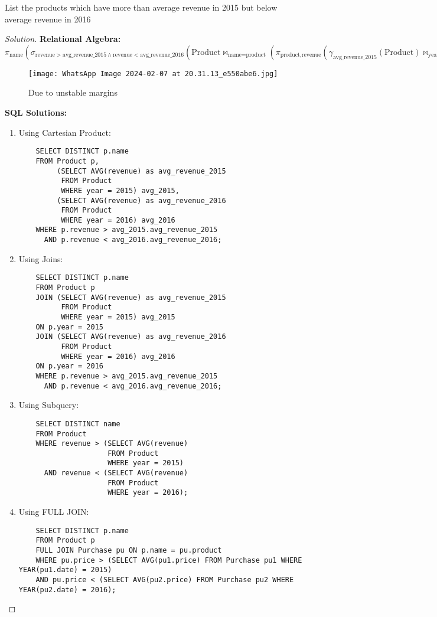 \documentclass[10pt]{article}
\newenvironment{problem}[2][Problem]{\begin{trivlist}
\item[\hskip \labelsep {\bfseries #1}\hskip \labelsep {\bfseries #2.}]}{\end{trivlist}}
\begin{document}
\begin{problem}{10}
List the products which have more than average revenue in 2015 but below average revenue in 2016
\end{problem}

\begin{proof}[Solution]
\textbf{Relational Algebra:}
\[
\pi_{\text{name}}\left(\sigma_{\text{revenue} > \text{avg\_revenue\_2015} \land \text{revenue} < \text{avg\_revenue\_2016}}
 (\text{Product} \bowtie_{\text{name} = \text{product}} (\pi_{\text{product},

\text{revenue}}(\gamma_{\text{avg\_revenue\_2015}}(\text{Product}) \bowtie_{\text{year} = 2016} \gamma_{\text{avg\_revenue\_2016}}(\text{Product}))))
\right)
\]
\begin{figure}
    \centering
    \texttt{[image: WhatsApp Image 2024-02-07 at 20.31.13\_e550abe6.jpg]}
    \caption{Due to unstable margins}
    \label{fig1:}
\end{figure}


\textbf{SQL Solutions:}
\begin{enumerate}
    \item Using Cartesian Product:
    \begin{verbatim}
    SELECT DISTINCT p.name
    FROM Product p,
         (SELECT AVG(revenue) as avg_revenue_2015
          FROM Product
          WHERE year = 2015) avg_2015,
         (SELECT AVG(revenue) as avg_revenue_2016
          FROM Product
          WHERE year = 2016) avg_2016
    WHERE p.revenue > avg_2015.avg_revenue_2015
      AND p.revenue < avg_2016.avg_revenue_2016;
    \end{verbatim}
    
    \item Using Joins:
    \begin{verbatim}
    SELECT DISTINCT p.name
    FROM Product p
    JOIN (SELECT AVG(revenue) as avg_revenue_2015
          FROM Product
          WHERE year = 2015) avg_2015
    ON p.year = 2015
    JOIN (SELECT AVG(revenue) as avg_revenue_2016
          FROM Product
          WHERE year = 2016) avg_2016
    ON p.year = 2016
    WHERE p.revenue > avg_2015.avg_revenue_2015
      AND p.revenue < avg_2016.avg_revenue_2016;
    \end{verbatim}
    
    \item Using Subquery:
    \begin{verbatim}
    SELECT DISTINCT name
    FROM Product
    WHERE revenue > (SELECT AVG(revenue)
                     FROM Product
                     WHERE year = 2015)
      AND revenue < (SELECT AVG(revenue)
                     FROM Product
                     WHERE year = 2016);
    \end{verbatim}
\item Using FULL JOIN:
    \begin{verbatim}
    SELECT DISTINCT p.name
    FROM Product p
    FULL JOIN Purchase pu ON p.name = pu.product
    WHERE pu.price > (SELECT AVG(pu1.price) FROM Purchase pu1 WHERE YEAR(pu1.date) = 2015)
    AND pu.price < (SELECT AVG(pu2.price) FROM Purchase pu2 WHERE YEAR(pu2.date) = 2016);
    \end{verbatim}
    
\end{enumerate}
\end{proof}
\end{document}

